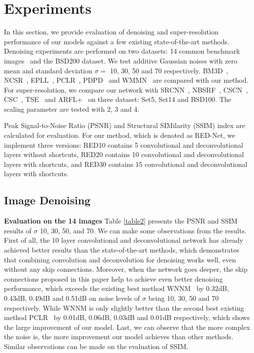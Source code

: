 
\section{Experiments}
In this section, we provide evaluation of denoising and super-resolution performance of our models against a few existing state-of-the-art methods. Denoising experiments are performed on two datasets: 14 common benchmark images~\cite{DBLP:conf/iccv/XuZZZF15,DBLP:conf/iccv/ChenZY15,DBLP:conf/cvpr/LiuXZG15,DBLP:conf/cvpr/GuZZF14} and the BSD200 dataset. We test additive Gaussian noises with zero mean and standard deviation $\sigma=$ 10, 30, 50 and 70 respectively. BM3D~\cite{DBLP:journals/tip/DabovFKE07}, NCSR~\cite{DBLP:journals/tip/DongZSL13}, EPLL~\cite{DBLP:conf/iccv/ZoranW11}, PCLR~\cite{DBLP:conf/iccv/ChenZY15}, PDPD~\cite{DBLP:conf/iccv/XuZZZF15} and WMMN~\cite{DBLP:conf/cvpr/GuZZF14} are compared with our method. For super-resolution, we compare our network with SRCNN~\cite{DBLP:journals/pami/DongLHT16}, NBSRF~\cite{DBLP:conf/iccv/SalvadorP15}, CSCN~\cite{DBLP:conf/iccv/WangLYHH15}, CSC~\cite{DBLP:conf/iccv/GuZXMFZ15}, TSE~\cite{DBLP:conf/cvpr/HuangSA15} and ARFL+~\cite{DBLP:conf/cvpr/SchulterLB15} on three dataset: Set5, Set14 and BSD100. The scaling parameter are tested with 2, 3 and 4.

Peak Signal-to-Noise Ratio (PSNR) and Structural SIMilarity (SSIM) index are calculated for evaluation. For our method, which is denoted as RED-Net, we implement three versions: RED10 contains 5 convolutional and deconvolutional layers without shortcuts, RED20 contains 10 convolutional and deconvolutional layers with shortcuts, and RED30 contains 15 convolutional and deconvolutional layers with shortcuts.

\subsection{Image Denoising}
{\bf Evaluation on the 14 images} Table \ref{table2} presents the PSNR and SSIM results of $\sigma$ 10, 30, 50, and 70. We can make some observations from the results. First of all, the 10 layer convolutional and deconvolutional network has already achieved better results than the state-of-the-art methods, which demonstrates that combining convolution and deconvolution for denoising works well, even without any skip connections. Moreover, when the network goes deeper, the skip connections proposed in this paper help to achieve even better denoising performance, which exceeds the existing best method WNNM~\cite{DBLP:conf/cvpr/GuZZF14} by 0.32dB, 0.43dB, 0.49dB and 0.51dB on noise levels of $\sigma$ being 10, 30, 50 and 70 respectively. While WNNM is only slightly better than the second best existing method PCLR~\cite{DBLP:conf/iccv/ChenZY15} by 0.01dB, 0.06dB, 0.03dB and 0.01dB respectively, which shows the large improvement of our model. Last, we can observe that the more complex the noise is, the more improvement our model achieves than other methods. Similar observations can be made on the evaluation of SSIM.

